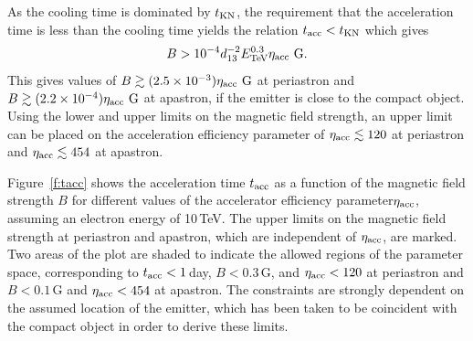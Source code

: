 \documentclass[preprint2]{aastex}
\newcommand{\tev}{\,TeV}
\begin{document}
As the cooling time is dominated by $t_{\mbox{\scriptsize{KN}}}$, the requirement that the acceleration time is less than the cooling time yields the relation $t_{\mbox{\scriptsize{acc}}} < t_{\mbox{\scriptsize{KN}}}$ which gives
\begin{equation}
B > 10^{-4} d_{13}^{-2} E_{\mbox{\scriptsize{TeV}}}^{0.3} \eta_{\mbox{\scriptsize{acc}}} \,\mbox{\,G}.
\end{equation}
This gives values of $B \gtrsim (2.5 \times 10^{-3}) \eta_{\mbox{\scriptsize{acc}}} \,\mbox{\,G}$ at periastron and $B \gtrsim (2.2 \times 10^{-4}) \eta_{\mbox{\scriptsize{acc}}} \,\mbox{\,G}$ at apastron, if the emitter is close to the compact object. Using the lower and upper limits on the magnetic field strength, an upper limit can be placed on the acceleration efficiency parameter of $\eta_{\mbox{\scriptsize{acc}}} \lesssim 120$ at periastron and $\eta_{\mbox{\scriptsize{acc}}} \lesssim 454$ at apastron.

Figure~\ref{f:tacc} shows the acceleration time $t_{\mbox{\scriptsize{acc}}}$ as a function of the magnetic field strength $B$ for different values of the accelerator efficiency parameter$\eta_{\mbox{\scriptsize{acc}}}$, assuming an electron energy of 10\tev{}. The upper limits on the magnetic field strength at periastron and apastron, which are independent of $\eta_{\mbox{\scriptsize{acc}}}$, are marked. Two areas of the plot are shaded to indicate the allowed regions of the parameter space, corresponding to $t_{\mbox{\scriptsize{acc}}} < 1$\,day, $B < 0.3$\,G, and $\eta_{\mbox{\scriptsize{acc}}} < 120$ at periastron and $B < 0.1$\,G and $\eta_{\mbox{\scriptsize{acc}}} < 454$ at apastron. The constraints are strongly dependent on the assumed location of the emitter, which has been taken to be coincident with the compact object in order to derive these limits.%
\end{document}
